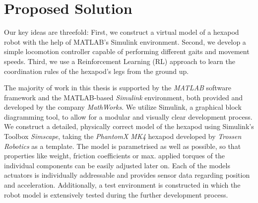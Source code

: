 \section{Proposed Solution}

Our key ideas are threefold: First, we construct a virtual model of a hexapod robot with the help of MATLAB's Simulink environment.
Second, we develop a simple locomotion controller capable of performing different gaits and movement speeds.
Third, we use a Reinforcement Learning (RL) approach to learn the coordination rules of the hexapod's legs from the ground up.

The majority of work in this thesis is supported by the \textit{MATLAB\textsuperscript{\textregistered}} software framework and the MATLAB-based \textit{Simulink\textsuperscript{\textregistered}} environment, both provided and developed by the company \textit{MathWorks\textsuperscript{\textregistered}}.
We utilize Simulink, a graphical block diagramming tool, to allow for a modular and visually clear development process.
We construct a detailed, physically correct model of the hexapod using Simulink's Toolbox \textit{Simscape\textsuperscript{\texttrademark}}, taking the \emph{PhantomX MK4} hexapod developed by \emph{Trossen Robotics} as a template.
The model is parametrised as well as possible, so that properties like weight, friction coefficients or max. applied torques of the individual components can be easily adjusted later on.
Each of the models actuators is individually addressable and provides sensor data regarding position and acceleration.
Additionally, a test environment is constructed in which the robot model is extensively tested during the further development process.

